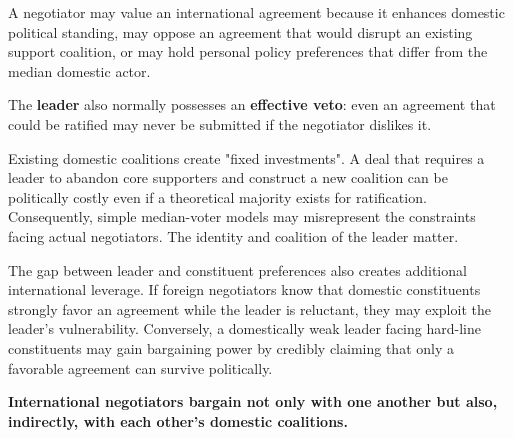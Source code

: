 A negotiator may value an international agreement because it enhances domestic political standing, may oppose an agreement that would disrupt an existing support coalition, or may hold personal policy preferences that differ from the median domestic actor.

The \textbf{leader} also normally possesses an \textbf{effective veto}: even an agreement that could be ratified may never be submitted if the negotiator dislikes it.

Existing domestic coalitions create "fixed investments". A deal that requires a leader to abandon core supporters and construct a new coalition can be politically costly even if a theoretical majority exists for ratification. Consequently, simple median-voter models may misrepresent the constraints facing actual negotiators. The identity and coalition of the leader matter.

The gap between leader and constituent preferences also creates additional international leverage. If foreign negotiators know that domestic constituents strongly favor an agreement while the leader is reluctant, they may exploit the leader's vulnerability. Conversely, a domestically weak leader facing hard-line constituents may gain bargaining power by credibly claiming that only a favorable agreement can survive politically.

\textbf{International negotiators bargain not only with one another but also, indirectly, with each other's domestic coalitions.}